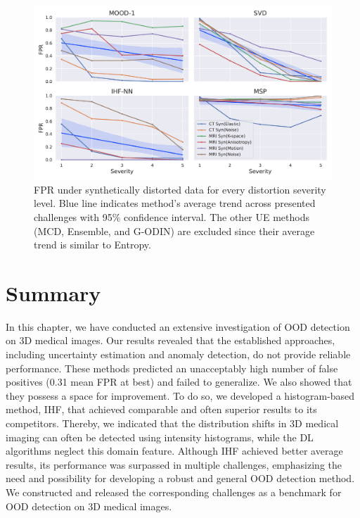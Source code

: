 \begin{figure}[ht]
	\centering
	\includegraphics[width=\textwidth]{Dissertation/Figures/5_ood_bench/fpr_sev.pdf}
	\caption{FPR under synthetically distorted data for every distortion severity level. Blue line indicates method's average trend across presented challenges with 95\% confidence interval. The other UE methods (MCD, Ensemble, and G-ODIN) are excluded since their average trend is similar to Entropy.}
	\label{fig:fpr_sev}
\end{figure}


\section{Summary}

In this chapter, we have conducted an extensive investigation of OOD detection on 3D medical images. Our results revealed that the established approaches, including uncertainty estimation and anomaly detection, do not provide reliable performance. These methods predicted an unacceptably high number of false positives (0.31 mean FPR at best) and failed to generalize. We also showed that they possess a space for improvement. To do so, we developed a histogram-based method, IHF, that achieved comparable and often superior results to its competitors. Thereby, we indicated that the distribution shifts in 3D medical imaging can often be detected using intensity histograms, while the DL algorithms neglect this domain feature. Although IHF achieved better average results, its performance was surpassed in multiple challenges, emphasizing the need and possibility for developing a robust and general OOD detection method. We constructed and released the corresponding challenges as a benchmark for OOD detection on 3D medical images.%





